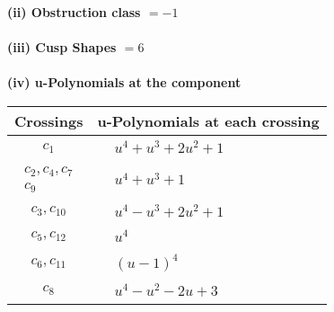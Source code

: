 \documentclass[1p]{elsarticle_modified}
\theoremstyle{definition}
\begin{document}
\flushleft \textbf{(ii) Obstruction class $= -1$}\\~\\
\flushleft \textbf{(iii) Cusp Shapes $= 6$}\\~\\
\newpage\renewcommand{\arraystretch}{1}
\flushleft \textbf{(iv) u-Polynomials at the component}\newline \\
\begin{tabular}{m{50pt}|m{274pt}}
Crossings & \hspace{64pt}u-Polynomials at each crossing \\
\hline $$\begin{aligned}c_{1}\end{aligned}$$&$\begin{aligned}
&u^4+u^3+2 u^2+1
\end{aligned}$\\
\hline $$\begin{aligned}c_{2},c_{4},c_{7}\\c_{9}\end{aligned}$$&$\begin{aligned}
&u^4+u^3+1
\end{aligned}$\\
\hline $$\begin{aligned}c_{3},c_{10}\end{aligned}$$&$\begin{aligned}
&u^4- u^3+2 u^2+1
\end{aligned}$\\
\hline $$\begin{aligned}c_{5},c_{12}\end{aligned}$$&$\begin{aligned}
&u^4
\end{aligned}$\\
\hline $$\begin{aligned}c_{6},c_{11}\end{aligned}$$&$\begin{aligned}
&(u-1)^4
\end{aligned}$\\
\hline $$\begin{aligned}c_{8}\end{aligned}$$&$\begin{aligned}
&u^4- u^2-2 u+3
\end{aligned}$\\
\hline
\end{tabular}\\~\\
\end{document}
